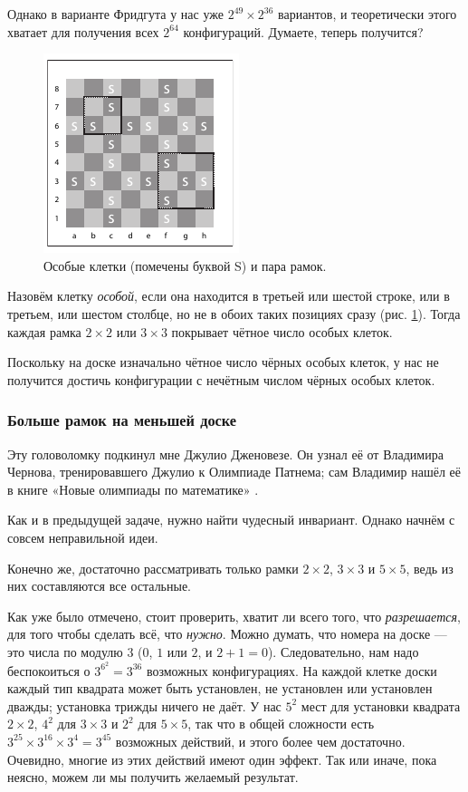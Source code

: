 Однако в варианте Фридгута у нас уже $2^{49} \times 2^{36}$ вариантов, и теоретически этого хватает для получения всех $2^{64}$ конфигураций.
Думаете, теперь получится?

\begin{figure}[ht!]
\centering
\includegraphics[scale=1]{pics/chess}
\caption{Особые клетки (помечены буквой S) и пара рамок.}
\label{pic:chess1}
\end{figure}

Назовём клетку \emph{особой}, если она находится в третьей или шестой строке, или в третьем, или шестом столбце, но не в обоих таких позициях сразу (рис. \ref{pic:chess1}).
Тогда каждая рамка $2 \times 2$ или $3 \times 3$ покрывает чётное число особых клеток.

Поскольку на доске изначально чётное число чёрных особых клеток, у нас не получится достичь конфигурации с нечётным  числом чёрных особых клеток.

\subsubsection*{Больше рамок на меньшей доске}

Эту головоломку подкинул мне Джулио Дженовезе.
Он узнал её от Владимира Чернова, тренировавшего Джулио к Олимпиаде Патнема; сам Владимир нашёл её в книге «Новые олимпиады по математике» \cite{markova}.

Как и в предыдущей задаче, нужно найти чудесный инвариант.
Однако начнём с совсем неправильной идеи.

Конечно же, достаточно рассматривать только рамки $2 \times 2$, $3 \times 3$ и $5 \times 5$, ведь из них составляются все остальные.

Как уже было отмечено, стоит проверить, хватит ли всего того, что \emph{разрешается}, для того чтобы сделать всё, что \emph{нужно}.
Можно думать, что номера на доске --- это числа по модулю $3$ ($0$, $1$ или $2$, и $2 + 1 = 0$).
Следовательно, нам надо беспокоиться о $3^{6^2} = 3^{36}$ возможных конфигурациях.
На каждой клетке доски каждый тип квадрата может быть установлен, не установлен или установлен дважды; установка трижды ничего не даёт.
У нас $5^2$ мест для установки квадрата $2 \times 2$,
$4^2$ для $3 \times 3$
и $2^2$ для $5 \times 5$, так что в общей сложности есть $3^{25} \times 3^{16} \times 3^4 = 3^{45}$ возможных действий, и этого более чем достаточно.
Очевидно, многие из этих действий имеют один эффект.
Так или иначе, пока неясно, можем ли мы получить желаемый результат.

